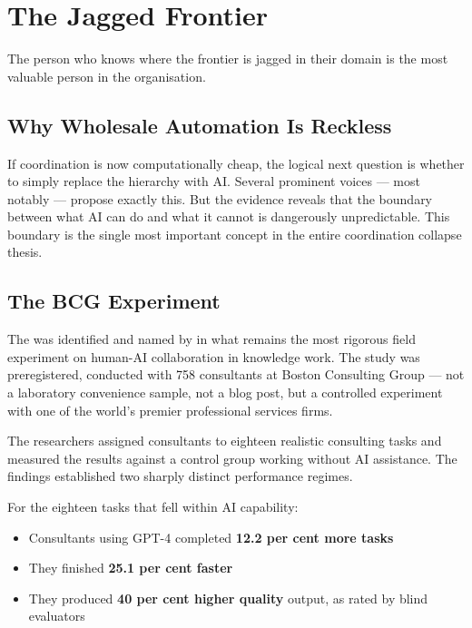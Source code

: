 \chapter{The Jagged Frontier}
\label{ch:jagged-frontier}

\epigraph{The person who knows where the frontier is jagged in their domain is the most valuable person in the organisation.}{}

\section{Why Wholesale Automation Is Reckless}

If coordination is now computationally cheap, the logical next question is whether to simply replace the hierarchy with AI. Several prominent voices --- most notably \textcite{DorseyBotha2026} --- propose exactly this. But the evidence reveals that the boundary between what AI can do and what it cannot is dangerously unpredictable. This boundary is the single most important concept in the entire coordination collapse thesis.

\section{The BCG Experiment}

The  was identified and named by \textcite{DellAcqua2026} in what remains the most rigorous field experiment on human-AI collaboration in knowledge work. The study was preregistered, conducted with 758 consultants at Boston Consulting Group --- not a laboratory convenience sample, not a blog post, but a controlled experiment with one of the world's premier professional services firms.

The researchers assigned consultants to eighteen realistic consulting tasks and measured the results against a control group working without AI assistance. The findings established two sharply distinct performance regimes.

\begin{evidencebox}[title={Inside the Frontier}]
For the eighteen tasks that fell within AI capability:
\begin{itemize}
  \item Consultants using GPT-4 completed \textbf{12.2 per cent more tasks}
  \item They finished \textbf{25.1 per cent faster}
  \item They produced \textbf{40 per cent higher quality} output, as rated by blind evaluators
\end{itemize}
\end{evidencebox}

